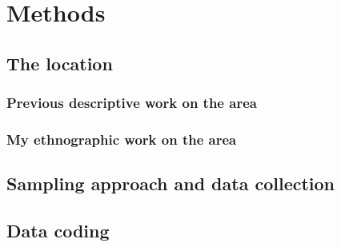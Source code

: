 \chapter{Methods}
  \section{The location}
    \subsection{Previous descriptive work on the area}
    \subsection{My ethnographic work on the area}
  \section{Sampling approach and data collection}
  \section{Data coding}
